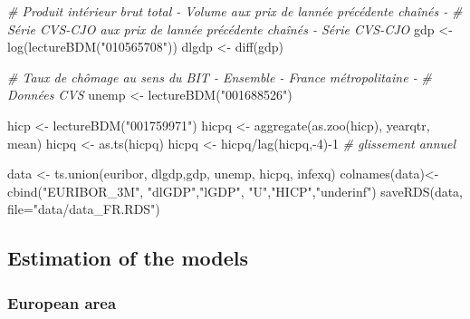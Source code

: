 \documentclass[
  10pt,
]{article}
\newenvironment{Shaded}{\begin{snugshade}}{\end{snugshade}}
\newcommand{\AttributeTok}[1]{\textcolor[rgb]{0.77,0.63,0.00}{#1}}
\newcommand{\CommentTok}[1]{\textcolor[rgb]{0.56,0.35,0.01}{\textit{#1}}}
\newcommand{\DecValTok}[1]{\textcolor[rgb]{0.00,0.00,0.81}{#1}}
\newcommand{\FunctionTok}[1]{\textcolor[rgb]{0.00,0.00,0.00}{#1}}
\newcommand{\NormalTok}[1]{#1}
\newcommand{\OtherTok}[1]{\textcolor[rgb]{0.56,0.35,0.01}{#1}}
\newcommand{\SpecialCharTok}[1]{\textcolor[rgb]{0.00,0.00,0.00}{#1}}
\newcommand{\StringTok}[1]{\textcolor[rgb]{0.31,0.60,0.02}{#1}}
\begin{document}
\begin{Shaded}
\begin{Highlighting}[]
\CommentTok{\# Produit intérieur brut total {-} Volume aux prix de l\textquotesingle{}année précédente chaînés {-} }
\CommentTok{\# Série CVS{-}CJO aux prix de l\textquotesingle{}année précédente chaînés {-} Série CVS{-}CJO}
\NormalTok{gdp }\OtherTok{\textless{}{-}} \FunctionTok{log}\NormalTok{(}\FunctionTok{lectureBDM}\NormalTok{(}\StringTok{"010565708"}\NormalTok{))}
\NormalTok{dlgdp }\OtherTok{\textless{}{-}} \FunctionTok{diff}\NormalTok{(gdp)}

\CommentTok{\# Taux de chômage au sens du BIT {-} Ensemble {-} France métropolitaine {-} }
\CommentTok{\# Données CVS}
\NormalTok{unemp }\OtherTok{\textless{}{-}} \FunctionTok{lectureBDM}\NormalTok{(}\StringTok{"001688526"}\NormalTok{)}

\NormalTok{hicp }\OtherTok{\textless{}{-}} \FunctionTok{lectureBDM}\NormalTok{(}\StringTok{"001759971"}\NormalTok{)}
\NormalTok{hicpq }\OtherTok{\textless{}{-}} \FunctionTok{aggregate}\NormalTok{(}\FunctionTok{as.zoo}\NormalTok{(hicp), yearqtr, mean)}
\NormalTok{hicpq }\OtherTok{\textless{}{-}} \FunctionTok{as.ts}\NormalTok{(hicpq)}
\NormalTok{hicpq }\OtherTok{\textless{}{-}}\NormalTok{ hicpq}\SpecialCharTok{/}\FunctionTok{lag}\NormalTok{(hicpq,}\SpecialCharTok{{-}}\DecValTok{4}\NormalTok{)}\SpecialCharTok{{-}}\DecValTok{1} \CommentTok{\# glissement annuel}

\NormalTok{data }\OtherTok{\textless{}{-}} \FunctionTok{ts.union}\NormalTok{(euribor, dlgdp,gdp, unemp, hicpq, infexq)}
\FunctionTok{colnames}\NormalTok{(data)}\OtherTok{\textless{}{-}}\FunctionTok{cbind}\NormalTok{(}\StringTok{"EURIBOR\_3M"}\NormalTok{, }\StringTok{"dlGDP"}\NormalTok{,}\StringTok{"lGDP"}\NormalTok{,}
                      \StringTok{"U"}\NormalTok{,}\StringTok{"HICP"}\NormalTok{,}\StringTok{"underinf"}\NormalTok{)}
\FunctionTok{saveRDS}\NormalTok{(data, }\AttributeTok{file=}\StringTok{"data/data\_FR.RDS"}\NormalTok{)}
\end{Highlighting}
\end{Shaded}

\hypertarget{estimation-of-the-models}{%
\subsection{Estimation of the models}\label{estimation-of-the-models}}

\hypertarget{european-area}{%
\subsubsection{European area}\label{european-area}}
\end{document}
